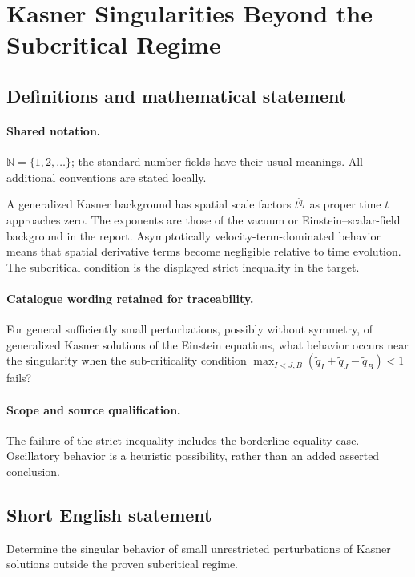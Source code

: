 \documentclass[11pt]{article}
\begin{document}
\section{Kasner Singularities Beyond the Subcritical Regime}\label{statement}

\subsection{Definitions and mathematical statement}

\paragraph{Shared notation.}$\mathbb N=\{1,2,\ldots\}$; the standard number fields have their usual meanings. All additional conventions are stated locally.


A generalized Kasner background has spatial scale factors $t^{\widetilde q_I}$ as proper time $t$ approaches zero. The exponents are those of the vacuum or Einstein--scalar-field background in the report. Asymptotically velocity-term-dominated behavior means that spatial derivative terms become negligible relative to time evolution. The subcritical condition is the displayed strict inequality in the target.

\paragraph{Catalogue wording retained for traceability.}
For general sufficiently small perturbations, possibly without symmetry, of generalized Kasner solutions of the Einstein equations, what behavior occurs near the singularity when the sub-criticality condition $\max_{I<J,B}(\widetilde q_I+\widetilde q_J-\widetilde q_B)<1$ fails?

\paragraph{Scope and source qualification.}The failure of the strict inequality includes the borderline equality case. Oscillatory behavior is a heuristic possibility, rather than an added asserted conclusion.
\subsection{Short English statement}
Determine the singular behavior of small unrestricted perturbations of Kasner solutions outside the proven subcritical regime.
\end{document}
